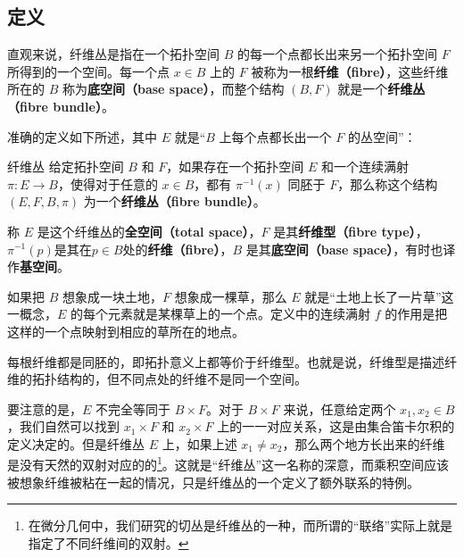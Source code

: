 
\begin{issues}
\issueDraft
\end{issues}


\subsection{定义}

直观来说，纤维丛是指在一个拓扑空间 $B$ 的每一个点都长出来另一个拓扑空间 $F$ 所得到的一个空间。每一个点 $x\in B$ 上的 $F$ 被称为一根\textbf{纤维（fibre）}，这些纤维所在的 $B$ 称为\textbf{底空间（base space）}，而整个结构 $(B, F)$ 就是一个\textbf{纤维丛（fibre bundle）}。

准确的定义如下所述，其中 $E$ 就是“$B$ 上每个点都长出一个 $F$ 的丛空间”：

\begin{definition}{纤维丛}
给定拓扑空间 $B$ 和 $F$，如果存在一个拓扑空间 $E$ 和一个连续满射 $\pi:E\rightarrow B$，使得对于任意的 $x\in B$，都有 $\pi^{-1}(x)$ 同胚于 $F$，那么称这个结构 $(E, F, B, \pi)$ 为一个\textbf{纤维丛（fibre bundle）}。

称 $E$ 是这个纤维丛的\textbf{全空间（total space）}，$F$ 是其\textbf{纤维型（fibre type）}，$\pi^{-1}(p)$是其在$p\in B$处的\textbf{纤维（fibre）}，$B$ 是其\textbf{底空间（base space）}，有时也译作\textbf{基空间}。
\end{definition}

如果把 $B$ 想象成一块土地，$F$ 想象成一棵草，那么 $E$ 就是“土地上长了一片草”这一概念，$E$ 的每个元素就是某棵草上的一个点。定义中的连续满射 $f$ 的作用是把这样的一个点映射到相应的草所在的地点。

每根纤维都是同胚的，即拓扑意义上都等价于纤维型。也就是说，纤维型是描述纤维的拓扑结构的，但不同点处的纤维不是同一个空间。

要注意的是，$E$ 不完全等同于 $B\times F$。对于 $B\times F$ 来说，任意给定两个 $x_1, x_2\in B$，我们自然可以找到 $x_1\times F$ 和 $x_2\times F$ 上的一一对应关系，这是由集合笛卡尔积的定义决定的。但是纤维丛 $E$ 上，如果上述 $x_1\not=x_2$，那么两个地方长出来的纤维是没有天然的双射对应的的\footnote{在微分几何中，我们研究的切丛是纤维丛的一种，而所谓的“联络”实际上就是指定了不同纤维间的双射。}。这就是“纤维丛”这一名称的深意，而乘积空间应该被想象纤维被粘在一起的情况，只是纤维丛的一个定义了额外联系的特例。

